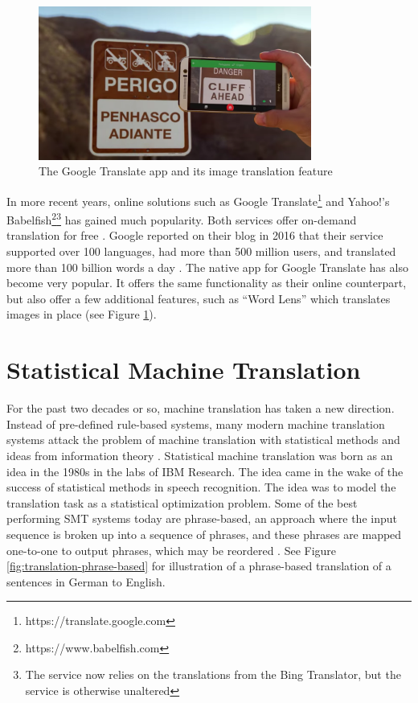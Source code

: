 \begin{figure}[ht]
    \centering
    \includegraphics[width=0.8\textwidth]{fig/background_theory/google_translate_rt.png}
    \caption{The Google Translate app and its image translation feature}
    \label{fig:google-translate-rt}
\end{figure}

In more recent years, online solutions such as Google Translate\footnote{https://translate.google.com} and Yahoo!'s Babelfish\footnote{https://www.babelfish.com}\footnote{The service now relies on the translations from the Bing Translator, but the service is otherwise unaltered} has gained much popularity. Both services offer on-demand translation for free \citep{schuster2016googletranslate, hutchins2007machine}. Google reported on their blog in 2016 that their service supported over 100 languages, had more than 500 million users, and translated more than 100 billion words a day \citep{turovsky2016googletranslate}. The native app for Google Translate has also become very popular. It offers the same functionality as their online counterpart, but also offer a few additional features, such as ``Word Lens'' which translates images in place (see Figure \ref{fig:google-translate-rt}).


\section{Statistical Machine Translation}
For the past two decades or so, machine translation has taken a new direction. Instead of pre-defined rule-based systems, many modern machine translation systems attack the problem of machine translation with statistical methods and ideas from information theory \citep{brown1990statistical}. Statistical machine translation was born as an idea in the 1980s in the labs of IBM Research. The idea came in the wake of the success of statistical methods in speech recognition. The idea was to model the translation task as a statistical optimization problem. Some of the best performing SMT systems today are phrase-based, an approach where the input sequence is broken up into a sequence of phrases, and these phrases are mapped one-to-one to output phrases, which may be reordered \citep{koehn2010statistical}. See Figure \ref{fig:translation-phrase-based} for illustration of a phrase-based translation of a sentences in German to English.


